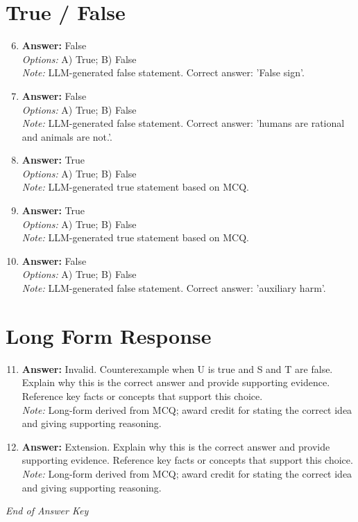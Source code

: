 \documentclass[12pt]{article}
\begin{document}
\section*{True / False}
\begin{enumerate}[label=\arabic*.]
\setcounter{enumi}{5}
\item \textbf{Answer:} False
\\ \textit{Options:} A) True; B) False
\\ \textit{Note:} LLM-generated false statement. Correct answer: 'False sign'.
\item \textbf{Answer:} False
\\ \textit{Options:} A) True; B) False
\\ \textit{Note:} LLM-generated false statement. Correct answer: 'humans are rational and animals are not.'.
\item \textbf{Answer:} True
\\ \textit{Options:} A) True; B) False
\\ \textit{Note:} LLM-generated true statement based on MCQ.
\item \textbf{Answer:} True
\\ \textit{Options:} A) True; B) False
\\ \textit{Note:} LLM-generated true statement based on MCQ.
\item \textbf{Answer:} False
\\ \textit{Options:} A) True; B) False
\\ \textit{Note:} LLM-generated false statement. Correct answer: 'auxiliary harm'.
\end{enumerate}

\section*{Long Form Response}
\begin{enumerate}[label=\arabic*.]
\setcounter{enumi}{10}
\item \textbf{Answer:} Invalid. Counterexample when U is true and S and T are false. Explain why this is the correct answer and provide supporting evidence. Reference key facts or concepts that support this choice.
\\ \textit{Note:} Long-form derived from MCQ; award credit for stating the correct idea and giving supporting reasoning.
\item \textbf{Answer:} Extension. Explain why this is the correct answer and provide supporting evidence. Reference key facts or concepts that support this choice.
\\ \textit{Note:} Long-form derived from MCQ; award credit for stating the correct idea and giving supporting reasoning.
\end{enumerate}

\vfill
\noindent\textit{End of Answer Key}
\end{document}
